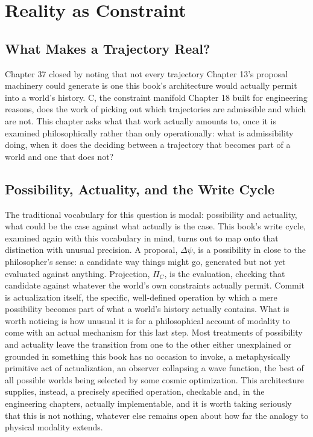 \chapter{Reality as Constraint}

\section{What Makes a Trajectory Real?}

Chapter 37 closed by noting that not every trajectory Chapter 13's proposal machinery could generate is one this book's architecture would actually permit into a world's history. C, the constraint manifold Chapter 18 built for engineering reasons, does the work of picking out which trajectories are admissible and which are not. This chapter asks what that work actually amounts to, once it is examined philosophically rather than only operationally: what is admissibility doing, when it does the deciding between a trajectory that becomes part of a world and one that does not?

\section{Possibility, Actuality, and the Write Cycle}

The traditional vocabulary for this question is modal: possibility and actuality, what could be the case against what actually is the case. This book's write cycle, examined again with this vocabulary in mind, turns out to map onto that distinction with unusual precision. A proposal, \(\Delta\psi\), is a possibility in close to the philosopher's sense: a candidate way things might go, generated but not yet evaluated against anything. Projection, \(\Pi_C\), is the evaluation, checking that candidate against whatever the world's own constraints actually permit. Commit is actualization itself, the specific, well-defined operation by which a mere possibility becomes part of what a world's history actually contains. What is worth noticing is how unusual it is for a philosophical account of modality to come with an actual mechanism for this last step. Most treatments of possibility and actuality leave the transition from one to the other either unexplained or grounded in something this book has no occasion to invoke, a metaphysically primitive act of actualization, an observer collapsing a wave function, the best of all possible worlds being selected by some cosmic optimization. This architecture supplies, instead, a precisely specified operation, checkable and, in the engineering chapters, actually implementable, and it is worth taking seriously that this is not nothing, whatever else remains open about how far the analogy to physical modality extends.

